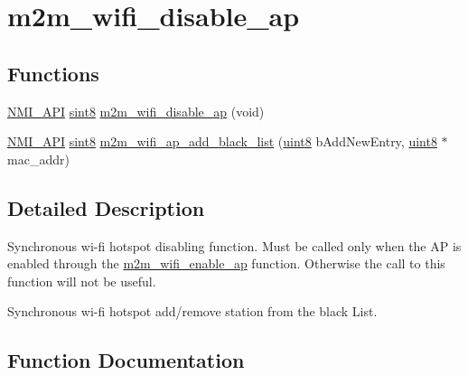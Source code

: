 \hypertarget{group__WifiDisableApFn}{}\section{m2m\+\_\+wifi\+\_\+disable\+\_\+ap}
\label{group__WifiDisableApFn}
\subsection*{Functions}
\begin{DoxyCompactItemize}
\item 
\hyperlink{group__BSPDefine_gaecc0323d771e41ef81a76b5f12783e22}{N\+M\+I\+\_\+\+A\+PI} \hyperlink{group__DataT_gae35f10ffd0ac8dd2bc3e794da9bdfbc7}{sint8} \hyperlink{group__WifiDisableApFn_ga69d3d1d687a493fa31c05109cfe3d05a}{m2m\+\_\+wifi\+\_\+disable\+\_\+ap} (void)
\item 
\hyperlink{group__BSPDefine_gaecc0323d771e41ef81a76b5f12783e22}{N\+M\+I\+\_\+\+A\+PI} \hyperlink{group__DataT_gae35f10ffd0ac8dd2bc3e794da9bdfbc7}{sint8} \hyperlink{group__WifiDisableApFn_gafc6b3c4d3e41b821c37a6884b06481e0}{m2m\+\_\+wifi\+\_\+ap\+\_\+add\+\_\+black\+\_\+list} (\hyperlink{group__DataT_ga4df709a77647e870bbf1d955b8edc9a6}{uint8} b\+Add\+New\+Entry, \hyperlink{group__DataT_ga4df709a77647e870bbf1d955b8edc9a6}{uint8} $\ast$mac\+\_\+addr)
\end{DoxyCompactItemize}


\subsection{Detailed Description}
Synchronous wi-\/fi hotspot disabling function. Must be called only when the AP is enabled through the \hyperlink{group__WifiEnableApFn_gab34cff419964df3c4e1ed86076aef7ce}{m2m\+\_\+wifi\+\_\+enable\+\_\+ap} function. Otherwise the call to this function will not be useful.

Synchronous wi-\/fi hotspot add/remove station from the black List. 

\subsection{Function Documentation}
\mbox{\label{group__WifiDisableApFn_gafc6b3c4d3e41b821c37a6884b06481e0}} 
